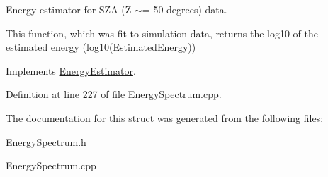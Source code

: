 Energy estimator for SZA (Z $\sim$= 50 degrees) data. 

This function, which was fit to simulation data, returns the log10 of the estimated energy (log10(EstimatedEnergy)) 

Implements \hyperlink{structEnergyEstimator}{EnergyEstimator}.



Definition at line 227 of file EnergySpectrum.cpp.



The documentation for this struct was generated from the following files:\begin{DoxyCompactItemize}
\item 
EnergySpectrum.h\item 
EnergySpectrum.cpp\end{DoxyCompactItemize}

